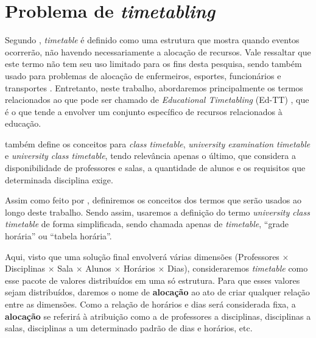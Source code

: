 \section{Problema de \textit{timetabling}} \label{sec:termos}                                                        %


Segundo , \textit{timetable} é definido como uma estrutura que mostra quando eventos ocorrerão, não havendo necessariamente a alocação de recursos. Vale ressaltar que este termo não tem seu uso limitado para os fins desta pesquisa, sendo também usado para problemas de alocação de enfermeiros, esportes, funcionários e transportes \cite{Arratia2021}. Entretanto, neste trabalho, abordaremos principalmente os termos relacionados ao que pode ser chamado de \textit{Educational Timetabling} (Ed-TT) \cite{Alencar2019}, que é o que tende a envolver um conjunto específico de recursos relacionados à educação.

 também define os conceitos para \textit{class timetable}, \textit{university examination timetable} e \textit{university class timetable}, tendo relevância apenas o último, que considera a disponibilidade de professores e salas, a quantidade de alunos e os requisitos que determinada disciplina exige.

Assim como feito por , definiremos os conceitos dos termos que serão usados ao longo deste trabalho. Sendo assim, usaremos a definição do termo \textit{university class timetable} de forma simplificada, sendo chamada apenas de \textit{timetable}, ``grade horária'' ou ``tabela horária''.


Aqui, visto que uma solução final envolverá várias dimensões (Professores $\times$ Disciplinas $\times$ Sala $\times$ Alunos $\times$ Horários $\times$ Dias), consideraremos \textit{timetable} como esse pacote de valores distribuídos em uma só estrutura. Para que esses valores sejam distribuídos, daremos o nome de \textbf{alocação} ao ato de criar qualquer relação entre as dimensões. Como a relação de horários e dias será considerada fixa, a \textbf{alocação} se referirá à atribuição como a de professores a disciplinas, disciplinas a salas, disciplinas a um determinado padrão de dias e horários, etc.

